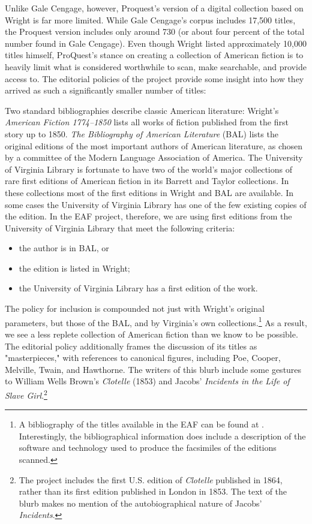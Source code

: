 Unlike Gale Cengage, however, Proquest's version of a digital collection based on Wright is far more limited. While Gale Cengage's corpus includes 17,500 titles, the Proquest version includes only around 730 (or about four percent of the total number found in Gale Cengage).\autocite{noauthor_early_nodate-4} Even though Wright listed approximately 10,000 titles himself, ProQuest's stance on creating a collection of American fiction is to heavily limit what is considered worthwhile to scan, make searchable, and provide access to. The editorial policies of the project provide some insight into how they arrived as such a significantly smaller number of titles:
\begin{displayquote}
Two standard bibliographies describe classic American literature: Wright's \textit{American Fiction 1774–1850} lists all works of fiction published from the first story up to 1850. \textit{The Bibliography of American Literature} (BAL) lists the original editions of the most important authors of American literature, as chosen by a committee of the Modern Language Association of America. The University of Virginia Library is fortunate to have two of the world's major collections of rare first editions of American fiction in its Barrett and Taylor collections. In these collections most of the first editions in Wright and BAL are available. In some cases the University of Virginia Library has one of the few existing copies of the edition. In the EAF project, therefore, we are using first editions from the University of Virginia Library that meet the following criteria:
\begin{itemize}
\item the author is in BAL, or
\item the edition is listed in Wright;
\item the University of Virginia Library has a first edition of the work.\autocite{noauthor_early_nodate-4}
\end{itemize} 
\end{displayquote}
The policy for inclusion is compounded not just with Wright's original parameters, but those of the BAL, and by Virginia's own collections.\footnote{A bibliography of the titles available in the EAF can be found at \autocite{noauthor_early_nodate-3}. Interestingly, the bibliographical information does include a description of the software and technology used to produce the facsimiles of the editions scanned.} As a result, we see a less replete collection of American fiction than we know to be possible. The editorial policy additionally frames the discussion of its titles as "masterpieces," with references to canonical figures, including Poe, Cooper, Melville, Twain, and Hawthorne. The writers of this blurb include some gestures to William Wells Brown's \textit{Clotelle} (1853) and Jacobs' \textit{Incidents in the Life of Slave Girl}.\footnote{The project includes the first U.S. edition of \textit{Clotelle} published in 1864, rather than its first edition published in London in 1853. The text of the blurb makes no mention of the autobiographical nature of Jacobs' \textit{Incidents}.}

